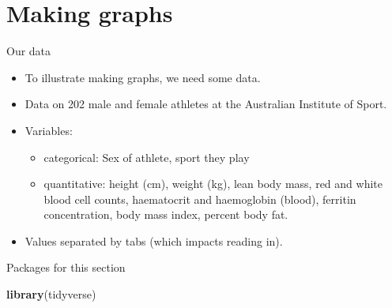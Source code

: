 \documentclass[ignorenonframetext,]{beamer}
\newenvironment{Shaded}{\begin{snugshade}}{\end{snugshade}}
\newcommand{\KeywordTok}[1]{\textcolor[rgb]{0.13,0.29,0.53}{\textbf{#1}}}
\newcommand{\NormalTok}[1]{#1}
\providecommand{\tightlist}{%
  \setlength{\itemsep}{0pt}\setlength{\parskip}{0pt}}
\begin{document}
\hypertarget{making-graphs}{%
\section{Making graphs}\label{making-graphs}}

\begin{frame}{Our data}
\protect\hypertarget{our-data}{}

\begin{itemize}
\tightlist
\item
  To illustrate making graphs, we need some data.
\item
  Data on 202 male and female athletes at the Australian Institute of
  Sport.
\item
  Variables:

  \begin{itemize}
  \tightlist
  \item
    categorical: Sex of athlete, sport they play
  \item
    quantitative: height (cm), weight (kg), lean body mass, red and
    white blood cell counts, haematocrit and haemoglobin (blood),
    ferritin concentration, body mass index, percent body fat.
  \end{itemize}
\item
  Values separated by tabs (which impacts reading in).
\end{itemize}

\end{frame}

\begin{frame}[fragile]{Packages for this section}
\protect\hypertarget{packages-for-this-section-1}{}

\begin{Shaded}
\begin{Highlighting}[]
\KeywordTok{library}\NormalTok{(tidyverse)}
\end{Highlighting}
\end{Shaded}

\end{frame}
\end{document}
